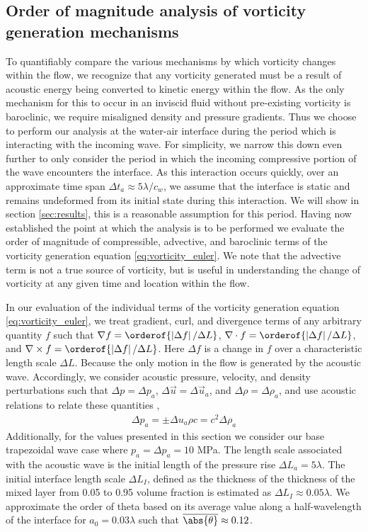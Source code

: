 \subsection{Order of magnitude analysis of vorticity generation mechanisms}
To quantifiably compare the various mechanisms by which vorticity
changes within the flow, we recognize that any vorticity generated
must be a result of acoustic energy being converted to kinetic energy
within the flow. As the only mechanism for this to occur in an
inviscid fluid without pre-existing vorticity is baroclinic, we
require misaligned density and pressure gradients. Thus we choose to
perform our analysis at the water-air interface during the period
which is interacting with the incoming wave. For simplicity, we narrow
this down even further to only consider the period in which the
incoming compressive portion of the wave encounters the interface. As
this interaction occurs quickly, over an approximate time span
$\Delta t_a\approx5\lambda/c_{w}$, we assume that the interface is
static and remains undeformed from its initial state during this
interaction. We will show in section \ref{sec:results}, this is a
reasonable assumption for this period. Having now established the
point at which the analysis is to be performed we evaluate the order
of magnitude of compressible, advective, and baroclinic terms of the
vorticity generation equation \eqref{eq:vorticity_euler}. We note that
the advective term is not a true source of vorticity, but is useful in
understanding the change of vorticity at any given time and location
within the flow.

In our evaluation of the individual terms of the vorticity generation
equation \eqref{eq:vorticity_euler}, we treat gradient, curl, and
divergence terms of any arbitrary quantity $f$ such that
$\nabla f= \orderof{\left|\Delta f\right|/\Delta L}$,
$\nabla\cdot f=\orderof{\left|\Delta f\right|/\Delta L}$, and
$\nabla\times f=\orderof{\left|\Delta f\right|/\Delta L}$. Here
$\Delta f$ is a change in $f$ over a characteristic length scale
$\Delta L$. Because the only motion in the flow is generated by the
acoustic wave. Accordingly, we consider acoustic pressure, velocity,
and density perturbations such that $\Delta p=\Delta p_a$,
$\Delta \vec{u}=\Delta \vec{u}_a$, and $\Delta \rho=\Delta \rho_a$,
and use acoustic relations to relate these quantities
\citep{Anderson1990},
\begin{align}%
  \label{eq:acoustic_relations}%
  \Delta p_a=\pm\Delta u_a \rho c=c^2\Delta \rho_a%
\end{align}
Additionally, for the values presented in this section we consider our base
trapezoidal wave case where $p_a = \Delta p_a = 10$ MPa. The length
scale associated with the acoustic wave is the initial length of the
pressure rise $\Delta L_a=5\lambda$. The initial interface length
scale $\Delta L_I$, defined as the thickness of the thickness of the
mixed layer from 0.05 to 0.95 volume fraction is estimated as
$\Delta L_I \approx 0.05\lambda$. We approximate the order of theta
based on its average value along a half-wavelength of the interface
for $a_0=0.03\lambda$ such that $\overline{\abs{\theta}}\approx0.12$.

